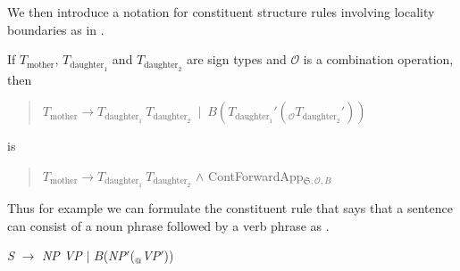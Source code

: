 We then introduce a notation for constituent structure rules involving
locality boundaries as in \nexteg{}.
\begin{ex} 
If $T_{\text{mother}}$, $T_{\text{daughter}_1}$ and
  $T_{\text{daughter}_2}$ are sign types and $\mathcal{O}$ is a
  combination operation, then
  \begin{quote}
    $T_{\text{mother}}\longrightarrow
    T_{\text{daughter}_1}\ T_{\text{daughter}_2}\ \mid\
    B(T_{\text{daughter}_1}'(_{\mathcal{O}}T_{\text{daughter}_2}'))$
  \end{quote}
  is
  \begin{quote}
  $T_{\text{mother}}\longrightarrow
    T_{\text{daughter}_1}\ T_{\text{daughter}_2}$ \d{\d{$\wedge$}}
    ContForwardApp$_{\mathfrak{S},\mathcal{O},B}$
  \end{quote}
  
\end{ex} 
Thus for example we can formulate the constituent rule that says
that a sentence can consist of a noun phrase followed by a verb phrase
as \nexteg{}.
\begin{ex} 
  \textit{S} $\longrightarrow$ \textit{NP VP} $\mid$ $B$(\textit{NP}$'$($_{\text{@}}$\textit{VP}$'$))
\end{ex}
  
